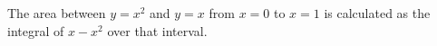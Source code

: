 \documentclass[preview]{standalone}
\begin{document}
\begin{center}
The area between $y = x^2$ and $y = x$ from $x = 0$ to $x = 1$ is calculated as the integral of $x - x^2$ over that interval.
\end{center}
\end{document}
